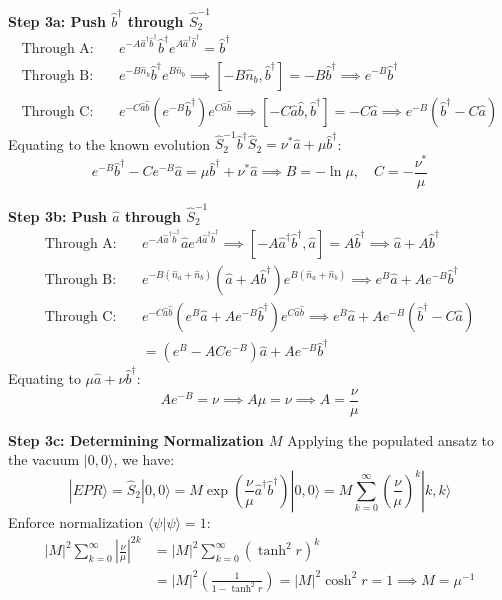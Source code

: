 \textbf{Step 3a: Push $\hat{b}^\dagger$ through $\hat{S}_2^{-1}$}
\begin{align*}
\text{Through A:} \quad & e^{-A\hat{a}^\dagger\hat{b}^\dagger} \hat{b}^\dagger e^{A\hat{a}^\dagger\hat{b}^\dagger} = \hat{b}^\dagger \\
\text{Through B:} \quad & e^{-B\hat{n}_b} \hat{b}^\dagger e^{B\hat{n}_b} \implies [-B\hat{n}_b, \hat{b}^\dagger] = -B\hat{b}^\dagger \implies e^{-B}\hat{b}^\dagger \\
\text{Through C:} \quad & e^{-C\hat{a}\hat{b}} (e^{-B}\hat{b}^\dagger) e^{C\hat{a}\hat{b}} \implies [-C\hat{a}\hat{b}, \hat{b}^\dagger] = -C\hat{a} \implies e^{-B}(\hat{b}^\dagger - C\hat{a})
\end{align*}
Equating to the known evolution $\hat{S}_2^{-1} \hat{b}^\dagger \hat{S}_2 = \nu^*\hat{a} + \mu\hat{b}^\dagger$:
\begin{equation*}
e^{-B}\hat{b}^\dagger - Ce^{-B}\hat{a} = \mu\hat{b}^\dagger + \nu^*\hat{a} \implies B = -\ln\mu, \quad C = -\frac{\nu^*}{\mu}
\end{equation*}

\textbf{Step 3b: Push $\hat{a}$ through $\hat{S}_2^{-1}$}
\begin{align*}
\text{Through A:} \quad & e^{-A\hat{a}^\dagger\hat{b}^\dagger} \hat{a} e^{A\hat{a}^\dagger\hat{b}^\dagger} \implies [-A\hat{a}^\dagger\hat{b}^\dagger, \hat{a}] = A\hat{b}^\dagger \implies \hat{a} + A\hat{b}^\dagger \\
\text{Through B:} \quad & e^{-B(\hat{n}_a+\hat{n}_b)} (\hat{a} + A\hat{b}^\dagger) e^{B(\hat{n}_a+\hat{n}_b)} \implies e^B\hat{a} + Ae^{-B}\hat{b}^\dagger \\
\text{Through C:} \quad & e^{-C\hat{a}\hat{b}} (e^B\hat{a} + Ae^{-B}\hat{b}^\dagger) e^{C\hat{a}\hat{b}} \implies e^B\hat{a} + Ae^{-B}(\hat{b}^\dagger - C\hat{a}) \\
& = (e^B - ACe^{-B})\hat{a} + Ae^{-B}\hat{b}^\dagger
\end{align*}
Equating to $\mu\hat{a} + \nu\hat{b}^\dagger$:
\begin{equation*}
Ae^{-B} = \nu \implies A\mu = \nu \implies A = \frac{\nu}{\mu}
\end{equation*}

\textbf{Step 3c: Determining Normalization $M$}
Applying the populated ansatz to the vacuum $|0,0\rangle$, we have:
\begin{equation*}
|EPR\rangle = \hat{S}_2|0,0\rangle = M \exp\left(\frac{\nu}{\mu}\hat{a}^\dagger\hat{b}^\dagger\right)|0,0\rangle = M \sum_{k=0}^{\infty} \left(\frac{\nu}{\mu}\right)^k |k,k\rangle
\end{equation*}
Enforce normalization $\langle \psi | \psi \rangle = 1$:
\begin{align*}
|M|^2 \sum_{k=0}^{\infty} \left|\frac{\nu}{\mu}\right|^{2k} &= |M|^2 \sum_{k=0}^{\infty} (\tanh^2 r)^k \\
&= |M|^2 \left(\frac{1}{1 - \tanh^2 r}\right) = |M|^2 \cosh^2 r = 1 \implies M = \mu^{-1}
\end{align*}

